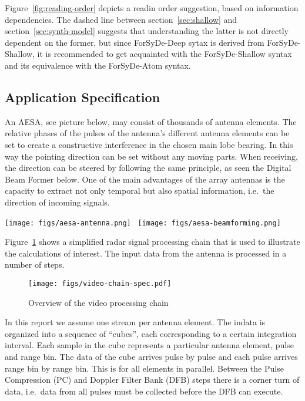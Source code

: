\documentclass[
  a4paper,
]{article}
\begin{document}
Figure~\ref{fig:reading-order} depicts a readin order suggestion, based
on information dependencies. The dashed line between
section~\ref{sec:shallow} and section~\ref{sec:synth-model} suggests
that understanding the latter is not directly dependent on the former,
but since ForSyDe-Deep sytax is derived from ForSyDe-Shallow, it is
recommended to get acquainted with the ForSyDe-Shallow syntax and its
equivalence with the ForSyDe-Atom syntax.

\hypertarget{sec:video-chain-spec}{%
\subsection{Application Specification}\label{sec:video-chain-spec}}

An AESA, see picture below, may consist of thousands of antenna
elements. The relative phases of the pulses of the antenna's different
antenna elements can be set to create a constructive interference in the
chosen main lobe bearing. In this way the pointing direction can be set
without any moving parts. When receiving, the direction can be steered
by following the same principle, as seen the Digital Beam Former below.
One of the main advantages of the array antennas is the capacity to
extract not only temporal but also spatial information, i.e.~the
direction of incoming signals.

\texttt{[image: figs/aesa-antenna.png]}
~\texttt{[image: figs/aesa-beamforming.png]}

Figure~\ref{fig:video-chain-spec} shows a simplified radar signal
processing chain that is used to illustrate the calculations of
interest. The input data from the antenna is processed in a number of
steps.

\begin{figure}
\hypertarget{fig:video-chain-spec}{%
\centering
\texttt{[image: figs/video-chain-spec.pdf]}
\caption{Overview of the video processing
chain}\label{fig:video-chain-spec}
}
\end{figure}

In this report we assume one stream per antenna element. The indata is
organized into a sequence of ``cubes'', each corresponding to a certain
integration interval. Each sample in the cube represents a particular
antenna element, pulse and range bin. The data of the cube arrives pulse
by pulse and each pulse arrives range bin by range bin. This is for all
elements in parallel. Between the Pulse Compression (PC) and Doppler
Filter Bank (DFB) steps there is a corner turn of data, i.e.~data from
all pulses must be collected before the DFB can execute.
\end{document}

